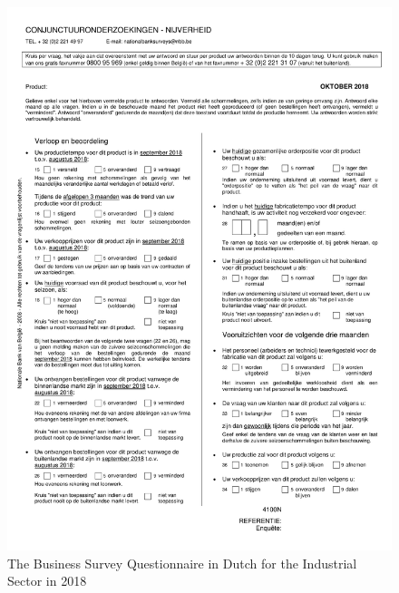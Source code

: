 \documentclass[12pt,a4paper,oneside]{book}
\begin{document}
\newpage
\begin{figure}[H]
    \centering
    \includegraphics[scale=0.75]{Images/IndustryN.pdf}
    \caption{The Business Survey Questionnaire in Dutch for the Industrial Sector in 2018}
    \label{Questionnaire2018}
\end{figure}
\end{document}
